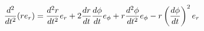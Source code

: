 \documentclass[preview]{standalone}
\begin{document}
\begin{align*}
\frac{d^2}{dt^2} ( r e_r ) = {d^2 r \over dt^2} e_r + 2 {d r \over dt} {d \phi \over dt} e_\phi + r {d^2 \phi \over dt^2} e_\phi - r \left( {d \phi \over dt} \right) ^2 e_{ r}
\end{align*}
\end{document}

